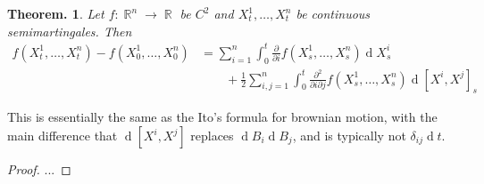 \documentclass[11pt, a4paper]{memoir}
\DeclareMathOperator{\R}{{\mathbb{R}}}
\newcommand{\agspace}{\ensuremath{\phantom{--}}}
\theoremstyle{change}
\newtheorem{theorem}{Theorem.}[section]
\theoremstyle{plain}
\theoremstyle{nonumberplain}
\newtheorem{proof}{Proof}
\renewcommand{\d}[1]{\ensuremath{\operatorname{d}\!{#1}}}
\numberwithin{equation}{section}
\begin{document}
\begin{theorem}
    Let $f:\R^n\to\R$ be $C^2$ and $X_t^1,\ldots,X_t^n$ be continuous semimartingales.
    Then
    \begin{align*}
        f(X_t^1,\ldots,X_t^n)-f(X_0^1,\ldots,X_0^n) &= \sum_{i=1}^n\int_0^t\frac{\partial}{\partial i}f(X_s^1,\ldots,X_s^n)\d{X_s^i}\\
                                                    &\agspace+\frac{1}{2}\sum_{i,j=1}^n\int_0^t\frac{\partial^2}{\partial i\partial j}f(X_s^1,\ldots,X_s^n)\d{[X^i,X^j]_s}
    \end{align*}
\end{theorem}
This is essentially the same as the Ito's formula for brownian motion, with the main difference that $\d{[X^i,X^j]}$ replaces $\d{B_i}\d{B_j}$, and is typically not $\delta_{ij}\d{t}$.
\begin{proof}
    ...
\end{proof}
\end{document}
